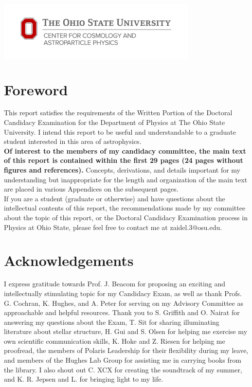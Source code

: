 \documentclass[12pt]{article}
\begin{document}
\begin{center}
\includegraphics[width=0.75\textwidth]{Bonus Graphics/CCAP-Horiz.png}
\end{center}
\vspace{-1.5cm}
\section*{Foreword}
This report satisfies the requirements of the Written Portion of the Doctoral Candidacy Examination for the Department of Physics at The Ohio State University. I intend this report to be useful and understandable to a graduate student interested in this area of astrophysics.\\

\vspace{-0.5cm}\textbf{Of interest to the members of my candidacy committee, the main text of this report is contained within the first 29 pages (24 pages without figures and references).} Concepts, derivations, and details important for my understanding but inappropriate for the length and organization of the main text are placed in various Appendices on the subsequent pages.
\\

\vspace{-0.5cm}If you are a student (graduate or otherwise) and have questions about the intellectual contents of this report, the recommendations made by my committee about the topic of this report, or the Doctoral Candidacy Examination process in Physics at Ohio State, please feel free to contact me at zaidel.3$@$osu.edu.

\section*{Acknowledgements}
I express gratitude towards Prof. J. Beacom for proposing an exciting and intellectually stimulating topic for my Candidacy Exam, as well as thank Profs. G. Cochran, K. Hughes, and A. Peter for serving on my Advisory Committee as approachable and helpful resources. Thank you to S. Griffith and O. Nairat for answering my questions about the Exam, T. Sit for sharing illuminating literature about stellar structure, H. Gui and S. Olsen for helping me exercise my own scientific communication skills, K. Hoke and Z. Riesen for helping me proofread, the members of Polaris Leadership for their flexibility during my leave, and members of the Hughes Lab Group for assisting me in carrying books from the library. I also shout out C. XCX for creating the soundtrack of my summer, and K. R. Jepsen and L. for bringing light to my life.
\end{document}
